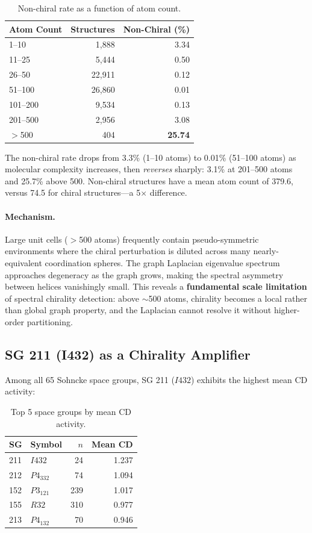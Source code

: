\documentclass[11pt,a4paper]{article}
\begin{document}
\begin{table}[H]
\centering
\caption{Non-chiral rate as a function of atom count.}
\label{tab:cliff}
\begin{tabular}{lrr}
\toprule
Atom Count & Structures & Non-Chiral (\%) \\
\midrule
1--10 & 1,888 & 3.34 \\
11--25 & 5,444 & 0.50 \\
26--50 & 22,911 & 0.12 \\
51--100 & 26,860 & 0.01 \\
101--200 & 9,534 & 0.13 \\
201--500 & 2,956 & 3.08 \\
$>$500 & 404 & \textbf{25.74} \\
\bottomrule
\end{tabular}
\end{table}

\noindent The non-chiral rate drops from 3.3\% (1--10 atoms) to 0.01\% (51--100 atoms) as molecular complexity increases, then \emph{reverses} sharply: 3.1\% at 201--500 atoms and 25.7\% above 500. Non-chiral structures have a mean atom count of 379.6, versus 74.5 for chiral structures---a 5$\times$ difference.

\paragraph{Mechanism.} Large unit cells ($>$500 atoms) frequently contain pseudo-symmetric environments where the chiral perturbation is diluted across many nearly-equivalent coordination spheres. The graph Laplacian eigenvalue spectrum approaches degeneracy as the graph grows, making the spectral asymmetry between helices vanishingly small. This reveals a \textbf{fundamental scale limitation} of spectral chirality detection: above $\sim$500 atoms, chirality becomes a local rather than global graph property, and the Laplacian cannot resolve it without higher-order partitioning.

\subsection{SG 211 (I432) as a Chirality Amplifier}

Among all 65 Sohncke space groups, SG 211 ($I432$) exhibits the highest mean CD activity:

\begin{table}[H]
\centering
\caption{Top 5 space groups by mean CD activity.}
\label{tab:sg_top}
\begin{tabular}{llrr}
\toprule
SG & Symbol & $n$ & Mean CD \\
\midrule
211 & $I432$ & 24 & 1.237 \\
212 & $P4_332$ & 74 & 1.094 \\
152 & $P3_121$ & 239 & 1.017 \\
155 & $R32$ & 310 & 0.977 \\
213 & $P4_132$ & 70 & 0.946 \\
\bottomrule
\end{tabular}
\end{table}
\end{document}
